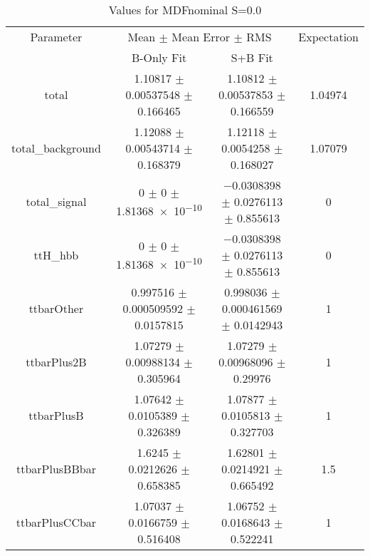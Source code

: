 \begin{table}
\centering
\caption{Values for MDFnominal S=0.0}
\begin{tabular}{cccc}
\toprule
Parameter & \multicolumn{2}{c}{Mean $\pm$ Mean Error $\pm$ RMS} & Expectation\\
 & B-Only Fit & S+B Fit & \\
\midrule
total & \num{1.10817} $\pm$ \num{0.00537548} $\pm$ \num{0.166465} & \num{1.10812} $\pm$ \num{0.00537853} $\pm$ \num{0.166559} & \num{1.04974}\\
total\_background & \num{1.12088} $\pm$ \num{0.00543714} $\pm$ \num{0.168379} & \num{1.12118} $\pm$ \num{0.0054258} $\pm$ \num{0.168027} & \num{1.07079}\\
total\_signal & \num{0} $\pm$ \num{0} $\pm$ \num{1.81368e-10} & \num{-0.0308398} $\pm$ \num{0.0276113} $\pm$ \num{0.855613} & \num{0}\\
ttH\_hbb & \num{0} $\pm$ \num{0} $\pm$ \num{1.81368e-10} & \num{-0.0308398} $\pm$ \num{0.0276113} $\pm$ \num{0.855613} & \num{0}\\
ttbarOther & \num{0.997516} $\pm$ \num{0.000509592} $\pm$ \num{0.0157815} & \num{0.998036} $\pm$ \num{0.000461569} $\pm$ \num{0.0142943} & \num{1}\\
ttbarPlus2B & \num{1.07279} $\pm$ \num{0.00988134} $\pm$ \num{0.305964} & \num{1.07279} $\pm$ \num{0.00968096} $\pm$ \num{0.29976} & \num{1}\\
ttbarPlusB & \num{1.07642} $\pm$ \num{0.0105389} $\pm$ \num{0.326389} & \num{1.07877} $\pm$ \num{0.0105813} $\pm$ \num{0.327703} & \num{1}\\
ttbarPlusBBbar & \num{1.6245} $\pm$ \num{0.0212626} $\pm$ \num{0.658385} & \num{1.62801} $\pm$ \num{0.0214921} $\pm$ \num{0.665492} & \num{1.5}\\
ttbarPlusCCbar & \num{1.07037} $\pm$ \num{0.0166759} $\pm$ \num{0.516408} & \num{1.06752} $\pm$ \num{0.0168643} $\pm$ \num{0.522241} & \num{1}\\
\bottomrule
\end{tabular}
\end{table}